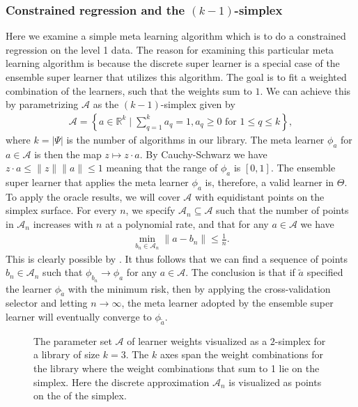 \documentclass[11pt, a4paper]{article}
\theoremstyle{definition}
\theoremstyle{remark}
\newcommand\norm[1]{\lVert#1\rVert}
\newcommand{\q}{q}
\newcommand{\ml}{k}
\newcommand{\lib}{\Psi}
\newcommand{\meta}{\phi}
\begin{document}
\subsubsection{Constrained regression and the $ (\ml-1) $-simplex} 
Here we examine a simple meta learning algorithm which is to do a constrained regression on the level 1 data. The reason for examining this particular meta learning algorithm is because the discrete super learner is a special case of the ensemble super learner that utilizes this algorithm. The goal is to fit a weighted combination of the learners, such that the weights sum to $ 1 $. We can achieve this by parametrizing $ \mathcal{A} $ as the $ (\ml -1) $-simplex given by
\begin{align*}
    \mathcal{A} = \left\{ a \in \mathbb{R}^{\ml} \mid \sum_{\q = 1}^{\ml} a_\q = 1 , a_\q \geq 0 \text{ for } 1 \leq \q \leq k \right\}, 
\end{align*}
where $ k = | \lib | $ is the number of algorithms in our library. The meta learner $ \meta_{a} $ for $ a \in \mathcal{A} $ is then the map $ z \mapsto z \cdot a $. By Cauchy-Schwarz we have $ z \cdot a \leq \norm{z} \norm{a} \leq 1 $ meaning that the range of $ \meta_a $ is $ [0,1] $. The ensemble super learner that applies the meta learner $ \meta_a $ is, therefore, a valid learner in $ \Theta $. To apply the oracle results, we will cover $ \mathcal{A} $ with equidistant points on the simplex surface. For every $ n $, we specify $ \mathcal{A}_n \subseteq \mathcal{A} $ such that the number of points in $ \mathcal{A}_n $ increases with $ n $ at a polynomial rate, and that for any $ a \in \mathcal{A} $ we have 
\begin{align*}
    \min_{b_n \in \mathcal{A}_n } \norm{a - b_n} \leq \frac{1}{n}.
\end{align*}
This is clearly possible by . It thus follows that we can find a sequence of points $ b_n \in \mathcal{A}_n $ such that $ \meta_{b_n} \to \meta_{a} $ for any $ a \in \mathcal{A}$. The conclusion is that if $ \tilde{a} $ specified the learner $ \meta_{ \tilde{a} } $ with the minimum risk, then by applying the cross-validation selector and letting $ n \to \infty $, the meta learner adopted by the ensemble super learner will eventually converge to $ \meta_{ \tilde{a} } $. 

\begin{figure}[H]
    \centering
    
    \caption{The parameter set $ \mathcal{A} $ of learner weights visualized as a $ 2 $-simplex for a library of size $ \ml = 3 $. The $ k $ axes span the weight combinations for the library where the weight combinations that sum to 1 lie on the simplex. Here the discrete approximation $ \mathcal{A}_n $ is visualized as points on the of the simplex.}
    \label{fig:simplex}
\end{figure}
\end{document}
